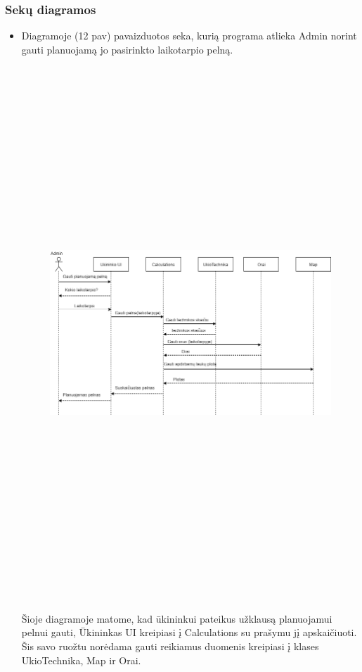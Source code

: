 \documentclass[oneside]{VUMIFPSkursinis}
\begin{document}
\subsubsection{Sekų diagramos}
\begin{itemize}
\item Diagramoje (12 pav) pavaizduotos seka, kurią programa atlieka Admin norint gauti planuojamą jo pasirinkto laikotarpio pelną.
		\begin{figure}[H]
		\centering	
	\includegraphics[width=17cm,height=20cm,keepaspectratio]{PelnoSkaičiavimas.png}
	\caption{}
	\label{fig:PelnoSkaičiavimas}
\end{figure}
Šioje diagramoje matome, kad ūkininkui pateikus užklausą planuojamui pelnui gauti, Ūkininkas UI kreipiasi į Calculations su prašymu jį apskaičiuoti. Šis savo ruožtu norėdama gauti reikiamus duomenis kreipiasi į klases UkioTechnika, Map ir Orai.

\end{itemize}
\end{document}
